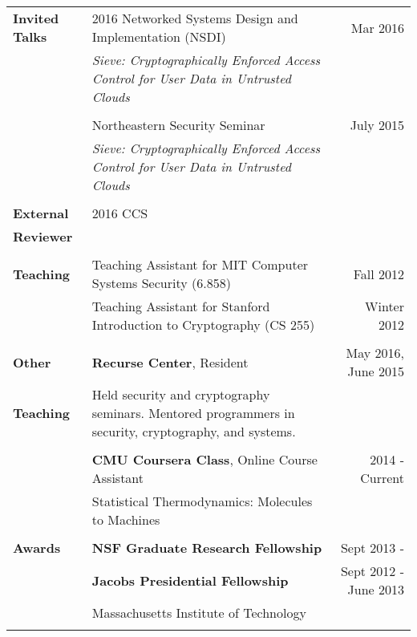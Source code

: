 \documentclass[a4paper,10pt]{article}
\begin{document}
\begin{tabular*}{0.95 \textwidth} { p{0.9in} l @{\extracolsep{\fill}} r}

\textbf{Invited Talks} & 2016 Networked Systems Design and Implementation (NSDI) & Mar 2016 \\
& \begin{minipage}[t]{0.6 \textwidth} 
\textit{Sieve: Cryptographically Enforced Access Control for User Data in Untrusted Clouds} \end{minipage} & \\ \\
& Northeastern Security Seminar & July 2015 \\
& \begin{minipage}[t]{0.6 \textwidth} \textit{Sieve: Cryptographically Enforced Access Control for User Data in Untrusted Clouds} \end{minipage} & \\ \\

\textbf{External} & 2016 CCS & \\
\textbf{Reviewer} & & \\ \\

\textbf{Teaching} 
& Teaching Assistant for MIT Computer Systems Security (6.858) & Fall 2012 \\
& Teaching Assistant for Stanford Introduction to Cryptography (CS 255) & Winter 2012 \\ \\

\textbf{Other} & \textbf{Recurse Center}, Resident & May 2016, June 2015 \\ 
\textbf{Teaching} & \begin{minipage}[t]{0.5 \textwidth} 
Held security and cryptography seminars. Mentored programmers 
in security, cryptography, and systems. 
\end{minipage} \\ \\

 & \textbf{CMU Coursera Class}, Online Course Assistant & 2014 - Current\\
 & Statistical Thermodynamics: Molecules to Machines & \\ \\

\textbf{Awards} & \textbf{NSF Graduate Research Fellowship} & Sept 2013 - \\
& \textbf{Jacobs Presidential Fellowship} & Sept 2012 - June 2013\\
& Massachusetts Institute of Technology \\
\\


\end{tabular*}
\end{document}
